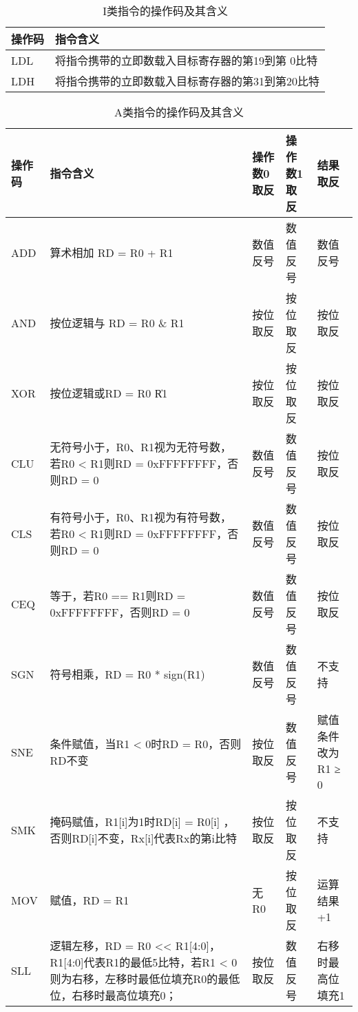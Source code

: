 \begin{table}
    \centering
    \caption[I类指令的操作码及其含义]{I类指令的操作码及其含义\label{tb:i_instructions}}
    \begin{tabular}{C{2cm}|C{12cm}}
        \toprule
        操作码 & 指令含义 \\
        \midrule
        LDL & 将指令携带的立即数载入目标寄存器的第19到第 0比特\\
        LDH & 将指令携带的立即数载入目标寄存器的第31到第20比特\\
        \bottomrule
    \end{tabular}
\end{table}

\begin{table}
    \centering
    \caption[A类指令的操作码及其含义]{A类指令的操作码及其含义\label{tb:a_instructions}}
    \begin{tabular}{C{1.3cm}|L{7.5cm}|C{1cm}|C{1cm}|C{2cm}}
        \toprule
        操作码 & 指令含义 & 操作数0取反 & 操作数1取反 & 结果取反 \\
        \hline
        \midrule
        ADD & 算术相加 RD = R0 + R1 & 数值反号 & 数值反号 & 数值反号 \\
        \hline
        AND & 按位逻辑与 RD = R0 \& R1 & 按位取反 & 按位取反 & 按位取反 \\
        \hline
        XOR & 按位逻辑或RD = R0 \| R1 & 按位取反 & 按位取反 & 按位取反 \\
        \hline
        CLU & 无符号小于，R0、R1视为无符号数，若R0 < R1则RD = 0xFFFFFFFF，否则RD = 0 & 数值反号 & 数值反号 & 按位取反 \\
        \hline
        CLS & 有符号小于，R0、R1视为有符号数，若R0 < R1则RD = 0xFFFFFFFF，否则RD = 0 & 数值反号 & 数值反号 & 按位取反 \\
        \hline
        CEQ & 等于，若R0 == R1则RD = 0xFFFFFFFF，否则RD = 0 & 数值反号 & 数值反号 & 按位取反 \\
        \hline
        SGN & 符号相乘，RD = R0 * sign(R1) & 数值反号 & 数值反号 & 不支持 \\
        \hline
        SNE & 条件赋值，当R1 < 0时RD = R0，否则RD不变 & 按位取反 & 数值反号 & 赋值条件改为R1 ≥ 0 \\
        \hline
        SMK & 掩码赋值，R1[i]为1时RD[i] = R0[i] ，否则RD[i]不变，Rx[i]代表Rx的第i比特 & 按位取反 & 按位取反 & 不支持 \\
        \hline
        MOV & 赋值，RD = R1 & 无R0 & 按位取反 & 运算结果+1\\
        \hline
        SLL & 逻辑左移，RD = R0 << R1[4:0]，R1[4:0]代表R1的最低5比特，若R1 < 0 则为右移，左移时最低位填充R0的最低位，右移时最高位填充0； & 按位取反 & 数值反号 & 右移时最高位填充1 \\

\end{tabular}
\end{table}

